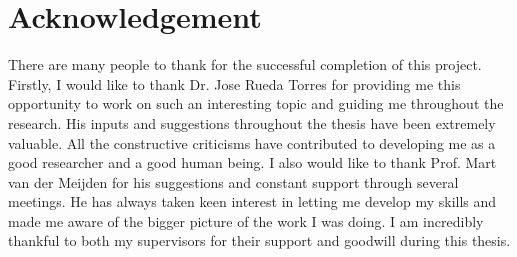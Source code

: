 \chapter*{Acknowledgement}
There are many people to thank for the successful completion of this project. Firstly, I would like to thank Dr. Jose Rueda Torres for providing me this opportunity to work on such an interesting topic and guiding me throughout the research. His inputs and suggestions throughout the thesis have been extremely valuable. All the constructive criticisms have contributed to developing me as a good researcher and a good human being. I also would like to thank Prof. Mart van der Meijden for his suggestions and constant support through several meetings. He has always taken keen interest in letting me develop my skills and made me aware of the bigger picture of the work I was doing. I am incredibly thankful to both my supervisors for their support and goodwill during this thesis. 


